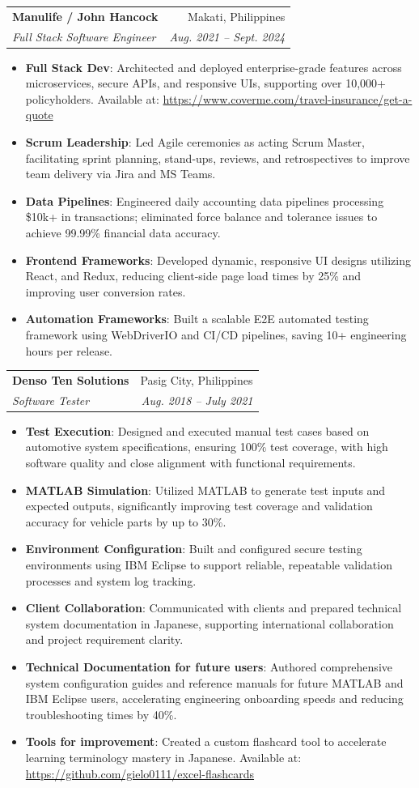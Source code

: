 \documentclass[letterpaper,11pt]{article}
\makeatletter
\newcommand{\resumeItem}[2]{
  \item\small{
    \textbf{#1}{: #2 \vspace{-2pt}}
  }
}
\newcommand{\resumeSubheading}[4]{
  \vspace{-1pt}\item
    \begin{tabular*}{0.97\textwidth}{l@{\extracolsep{\fill}}r}
      \textbf{#1} & #2 \\
      \textit{\small#3} & \textit{\small #4} \\
    \end{tabular*}\vspace{-5pt}
}
\newcommand{\resumeItemListStart}{\begin{itemize}}
\newcommand{\resumeItemListEnd}{\end{itemize}\vspace{-5pt}}
\makeatother
\begin{document}
    \resumeSubheading
      {Manulife / John Hancock}{Makati, Philippines}
      {Full Stack Software Engineer}{Aug. 2021 -- Sept. 2024}
      \resumeItemListStart
        \resumeItem{Full Stack Dev}
          {Architected and deployed enterprise-grade features across microservices, secure APIs, and responsive UIs, supporting over 10,000+ policyholders. Available at: \url{https://www.coverme.com/travel-insurance/get-a-quote}}
        \resumeItem{Scrum Leadership}
          {Led Agile ceremonies as acting Scrum Master, facilitating sprint planning, stand-ups, reviews, and retrospectives to improve team delivery via Jira and MS Teams.}
        \resumeItem{Data Pipelines}
          {Engineered daily accounting data pipelines processing \$10k+ in transactions; eliminated force balance and tolerance issues to achieve 99.99\% financial data accuracy.}
        \resumeItem{Frontend Frameworks}
          {Developed dynamic, responsive UI designs utilizing React, and Redux, reducing client-side page load times by 25\% and improving user conversion rates.}
        \resumeItem{Automation Frameworks}
          {Built a scalable E2E automated testing framework using WebDriverIO and CI/CD pipelines, saving 10+ engineering hours per release.}
      \resumeItemListEnd

    \resumeSubheading
      {Denso Ten Solutions}{Pasig City, Philippines}
      {Software Tester}{Aug. 2018 -- July 2021}
      \resumeItemListStart
        \resumeItem{Test Execution}
          {Designed and executed manual test cases based on automotive system specifications, ensuring 100\% test coverage, with high software quality and close alignment with functional requirements.}
        \resumeItem{MATLAB Simulation}
          {Utilized MATLAB to generate test inputs and expected outputs, significantly improving test coverage and validation accuracy for vehicle parts by up to 30\%.}
        \resumeItem{Environment Configuration}
          {Built and configured secure testing environments using IBM Eclipse to support reliable, repeatable validation processes and system log tracking.}
        \resumeItem{Client Collaboration}
          {Communicated with clients and prepared technical system documentation in Japanese, supporting international collaboration and project requirement clarity.}
        \resumeItem{Technical Documentation for future users}
          {Authored comprehensive system configuration guides and reference manuals for future MATLAB and IBM Eclipse users, accelerating engineering onboarding speeds and reducing troubleshooting times by 40\%.}
        \resumeItem{Tools for improvement}
          {Created a custom flashcard tool to accelerate learning terminology mastery in Japanese. Available at: \url{https://github.com/gielo0111/excel-flashcards}}
      \resumeItemListEnd
\end{document}
